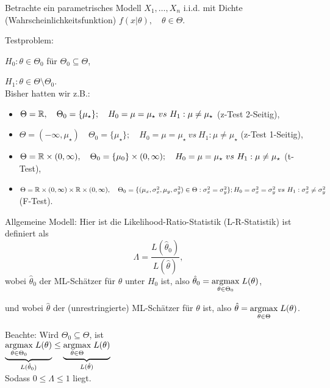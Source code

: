 \documentclass{tstextbook}
\begin{document}
Betrachte ein parametrisches Modell $ X_1,\ldots, X_n $ i.i.d. mit Dichte (Wahrscheinlichkeitsfunktion) $ f(x|\theta), \quad \theta \in \Theta $. 

Testproblem: 

$ H_0 \colon \theta\in\Theta_0 $ für $ \Theta_0\subseteq \Theta $,

$ H_1 \colon \theta\in\Theta\setminus\Theta_0 $. \\

Bisher hatten wir z.B.:
\begin{itemize}
	\item $ \Theta=\mathbb R, \quad \Theta_0 = \lbrace\mu_\star \rbrace;  \quad H_0 = \mu=\mu_\star \ vs \ H_1: \mu \neq \mu_\star $ (z-Test 2-Seitig), 
	
	\item $ \Theta=(-\infty, \mu_\star ) \quad \Theta_0 = \lbrace\mu_\star \rbrace;  \quad H_0 = \mu=\mu_\star \ vs \ H_1: \mu \neq \mu_\star $ (z-Test 1-Seitig), 
	
	\item $ \Theta=\mathbb R\times(0,\infty), \quad \Theta_0 = \lbrace\mu_0\rbrace\times(0,\infty);  \quad H_0 = \mu=\mu_\star \ vs \ H_1: \mu \neq \mu_\star  $ (t-Test), 
	
	\item $ \Theta= \mathbb R \times (0,\infty)\times \mathbb R \times (0,\infty), \quad \Theta_0 = \lbrace( \mu_x, \sigma_x ^2,\mu_y, \sigma_y^2) \in \Theta : \sigma_x ^2 = \sigma_y ^2 \rbrace ; \\ H_0 =  \sigma_x ^2 = \sigma_y ^2 \ vs \ H_1:  \sigma_x ^2 \neq \sigma_y ^2  $ (F-Test).
\end{itemize} 

Allgemeine Modell: Hier ist die Likelihood-Ratio-Statistik (L-R-Statistik)  ist definiert als 
\[
\Lambda = \frac{L(\hat{\theta}_0)}{L(\hat{\theta})}, 
\] wobei $ \hat{\theta}_0 $ der ML-Schätzer für $ \theta $ unter $ H_0 $ ist, also $ \hat{\theta}_0 = \underset{\theta\in\Theta_0}{\operatorname{argmax}} \; L(\theta) $, 

und wobei $ \hat{\theta} $ der (unrestringierte) ML-Schätzer für $ \theta $ ist, also $ \hat{\theta} = \underset{\theta\in\Theta}{\operatorname{argmax}} \; L(\theta) $.

\begin{remark}
Beachte:  Wird  $ \Theta_0\subseteq\Theta $, ist \\
$ \underbrace{ \underset{\theta\in\Theta_0}{\operatorname{argmax}}\; L(\theta) }_{L (\hat{\theta}_0)}   \leq  \underbrace {\underset{\theta\in\Theta}{\operatorname{argmax}} \; L(\theta)}_{L (\hat{\theta})} $ \\
Sodass $ 0\le\Lambda\le 1 $ liegt. 
\end{remark}
\end{document}
